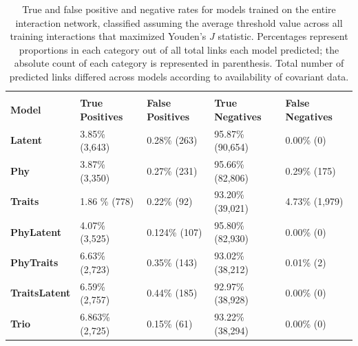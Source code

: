 \documentclass[num-refs]{article}%
\begin{document}
\clearpage 


\begin{table}[]
\caption{True and false positive and negative rates for models trained on the entire interaction network, classified assuming the average threshold value across all training interactions that maximized Youden's $J$ statistic. Percentages represent proportions in each category out of all total links each model predicted; the absolute count of each category is represented in parenthesis. Total number of predicted links differed across models according to availability of covariant data.}
\label{tab:confusion}
\begin{tabular}{@{}lllll@{}}
\toprule
{\ul } & {\ul } & {\ul } & {\ul } & {\ul } \\ 
   \textbf{Model}    &  \textbf{True Positives}      &    \textbf{False Positives}    &    \textbf{True Negatives}    &    \textbf{False Negatives}    \\
\midrule
\textbf{Latent}   &  3.85\% (3,643)      &    0.28\% (263)&    95.87\% (90,654)&    0.00\% (0)    \\
\textbf{Phy}       &   3.87\% (3,350)&  0.27\% (231)&   95.66\% (82,806)&     0.29\% (175)\\
\textbf{Traits}       &   1.86 \% (778)&  0.22\% (92)&  93.20\% (39,021)&       4.73\% (1,979)\\ 
\textbf{PhyLatent}       &    4.07\% (3,525)&     0.124\% (107)&    95.80\% (82,930)&    0.00\% (0)     \\ 
\textbf{PhyTraits}      &   6.63\% (2,723)&  0.35\% (143)&    93.02\% (38,212)&   0.01\% (2)\\ 
\textbf{TraitsLatent}       &   6.59\% (2,757)     & 0.44\% (185)& 92.97\% (38,928)&   0.00\% (0)     \\ 
\textbf{Trio}       &   6.863\% (2,725)&  0.15\% (61)&  93.22\% (38,294)&     0.00\% (0)    \\ 
\bottomrule
\end{tabular}
\end{table}


\clearpage 



\end{document}
